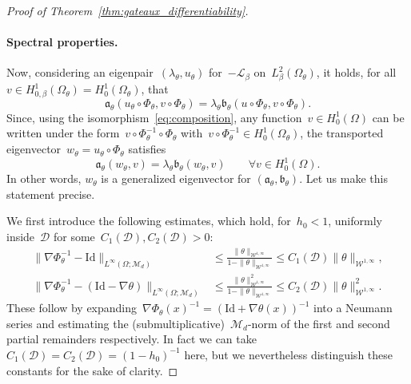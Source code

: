 \documentclass[a4]{article}
\newcommand{\cL}{\mathcal{L}}
\newcommand{\fa}{\mathfrak{a}}
\newcommand{\fb}{\mathfrak{b}}
\newcommand{\1}{\mathbbm 1}
\newcommand{\Winf}{{{\cW}^{1,\infty}}}
\newcommand{\Id}{\mathrm{Id}}
\newcommand{\cW}{\mathcal{W}}
\begin{document}
\begin{proof}[Proof of Theorem~\ref{thm:gateaux_differentiability}]
    \paragraph{Spectral properties.}
    Now, considering an eigenpair~$(\lambda_\theta,u_\theta)$ for~$-\cL_\beta$ on~$L^2_\beta(\Omega_\theta)$, it holds, for all~$v\in H_{0,\beta}^1(\Omega_\theta)=H_0^1(\Omega_\theta)$, that
    \[\fa_\theta\left(u_\theta\circ\Phi_\theta,v\circ\Phi_\theta\right) = \lambda_\theta \fb_\theta(u\circ\Phi_\theta,v\circ\Phi_\theta).\]
    Since, using the isomorphism~\eqref{eq:composition}, any function~$v\in H_0^1(\Omega)$ can be written under the form~$v\circ \Phi_{\theta}^{-1}\circ \Phi_\theta$ with~$v\circ\Phi_{\theta}^{-1}\in H_0^1(\Omega_\theta)$, the transported eigenvector~$w_\theta = u_\theta\circ \Phi_\theta$ satisfies
    \begin{equation}
        \fa_\theta(w_\theta,v) = \lambda_\theta \fb_\theta(w_\theta,v)\qquad \forall v\in H_0^1(\Omega).
    \end{equation}
    In other words, $w_\theta$ is a generalized eigenvector for $(\fa_\theta,\fb_\theta)$. Let us make this statement precise.

    We first introduce the following estimates, which hold, for~$h_0<1$, uniformly inside~$\mathcal D$ for some~$C_1(\mathcal D),C_2(\mathcal D)>0$:
    \begin{equation}
        \label{eq:grad_phi_estimates}
        \begin{aligned}
            \|\nabla\Phi_\theta^{-1} - \Id\|_{L^\infty(\Omega;\mathcal M_d)} &\leq \frac{\|\theta\|_{\Winf}}{1-\|\theta\|_{\Winf}} \leq C_1(\mathcal D) \|\theta\|_\Winf,\\
            \|\nabla\Phi_\theta^{-1}-\left(\Id-\nabla \theta\right)\|_{L^\infty(\Omega;\mathcal M_d)}&\leq \frac{\|\theta\|^2_{\Winf}}{1-\|\theta\|_{\Winf}} \leq C_2(\mathcal D)\|\theta\|^2_{\Winf}.
        \end{aligned}
    \end{equation}
    These follow by expanding~$\nabla\Phi_\theta(x)^{-1}=\left(\Id+\nabla\theta(x)\right)^{-1}$ into a Neumann series and estimating the (submultiplicative)~$\mathcal M_d$-norm of the first and second partial remainders respectively.
    In fact we can take $C_1(\mathcal D)=C_2(\mathcal D)=(1-h_0)^{-1}$ here, but we nevertheless distinguish these constants for the sake of clarity.
    

\end{proof}
\end{document}
